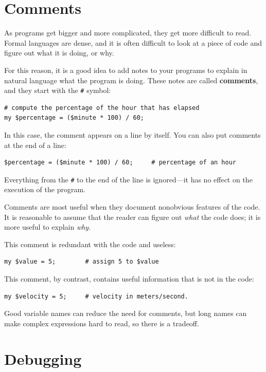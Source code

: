 \section{Comments}

As programs get bigger and more complicated, they get more difficult
to read.  Formal languages are dense, and it is often difficult to
look at a piece of code and figure out what it is doing, or why.

For this reason, it is a good idea to add notes to your programs to explain
in natural language what the program is doing.  These notes are called
{\bf comments}, and they start with the \verb"#" symbol:

\begin{verbatim}
# compute the percentage of the hour that has elapsed
my $percentage = ($minute * 100) / 60;
\end{verbatim}
%
In this case, the comment appears on a line by itself.  You can also put
comments at the end of a line:

\begin{verbatim}
$percentage = ($minute * 100) / 60;     # percentage of an hour
\end{verbatim}
%
Everything from the {\tt \#} to the end of the line is ignored---it
has no effect on the execution of the program.

Comments are most useful when they document nonobvious features of
the code.  It is reasonable to assume that the reader can figure out
{\em what} the code does; it is more useful to explain {\em why}.

This comment is redundant with the code and useless:

\begin{verbatim}
my $value = 5;        # assign 5 to $value
\end{verbatim}
%
This comment, by contrast, contains useful information that 
is not in the code:

\begin{verbatim}
my $velocity = 5;     # velocity in meters/second. 
\end{verbatim}
%
Good variable names can reduce the need for comments, but
long names can make complex expressions hard to read, so there is
a tradeoff.


\section{Debugging}


